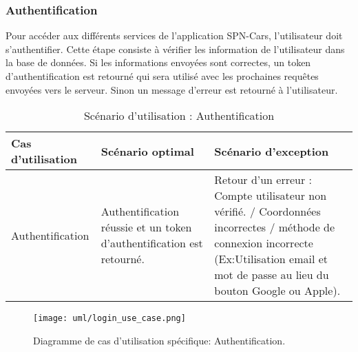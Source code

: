 \subsubsection{Authentification}
Pour accéder aux différents services de l'application SPN-Cars, l'utilisateur doit s'authentifier. Cette étape consiste à vérifier les information de l'utilisateur dans la base de données. Si les informations envoyées sont correctes, un token d'authentification est retourné qui sera utilisé avec les prochaines requêtes envoyées vers le serveur. Sinon un message d'erreur est retourné à l'utilisateur.
\begin{table}[H]
    \begin{center}
        \begin{tabularx}{\textwidth} {
                | >{\centering\arraybackslash}X
                | >{\centering\arraybackslash}X
                | >{\centering\arraybackslash}X |}
            \hline
            Cas d'utilisation & Scénario optimal                                                      & Scénario d'exception                                                                                                                                                                       \\
            \hline
            Authentification  & Authentification réussie et un token d'authentification est retourné. & Retour d'un erreur : Compte utilisateur non vérifié. / Coordonnées incorrectes / méthode de connexion incorrecte (Ex:Utilisation email et mot de passe au lieu du bouton Google ou Apple). \\
            \hline
        \end{tabularx}
        \captionsetup{justification=centering}
        \caption{Scénario d'utilisation : Authentification}
        \label{tab:login_scenario}
    \end{center}
\end{table}
\vspace{1cm}
\begin{figure}[H]
    \centering
    \texttt{[image: uml/login\_use\_case.png]}
    \vspace{1cm}
    \captionsetup{justification=centering}
    \caption{Diagramme de cas d'utilisation spécifique: Authentification.}
    \label{fig:use_case_login}
\end{figure}
